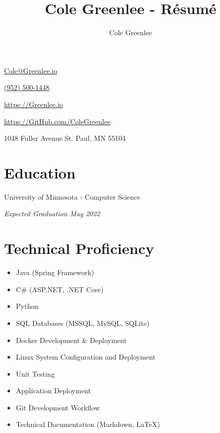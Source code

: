 \documentclass{article}
\title{Cole Greenlee - R\'esum\'e}
\author{Cole Greenlee}
\renewcommand{\maketitle}{
{\huge\bfseries\theauthor}
}
\begin{document}
\selectfont
\begin{multicols}{2}
\begin{description}
\item\maketitle
\item\href{mailto:Cole@Greenlee.io}{Cole@Greenlee.io}
\item\href{tel:+19525001448}{(952) 500-1448}
\begin{flushright}
\vspace{-1.5em}
\item\href{https://Greenlee.io}{https://Greenlee.io}
\item\href{https://GitHub.com/ColeGreenlee/}{https://GitHub.com/ColeGreenlee}
\item 1048 Fuller Avenue St. Paul, MN 55104
\end{flushright}
\end{description}
\end{multicols}

\section{Education}
\vspace{-1.5em}
\begin{multicols}{2}
\begin{flushleft}
University of Minnesota - Computer Science
\end{flushleft}
\begin{flushright}
\textit{Expected Graduation May 2022}
\end{flushright}
\end{multicols}

\section{Technical Proficiency}
\vspace{-1.5em}
\begin{multicols}{2}
\begin{itemize}[leftmargin=*]
	\item Java (Spring Framework)
	\item C\# (ASP.NET, .NET Core)
	\item Python
	\item SQL Databases (MSSQL, MySQL, SQLite)
	\item Docker Development \& Deployment
	\item Linux System Configuration and Deployment
	\item Unit Testing
	\item Application Deployment
	\item Git Development Workflow
	\item Technical Documentation (Markdown, LaTeX)
\end{itemize}
\end{multicols}
\end{document}
